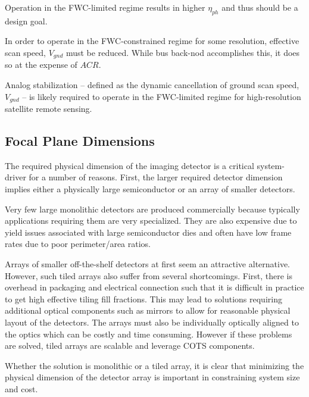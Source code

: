 \documentclass[]{spieman}  %
\begin{document}
\begin{observation}
Operation in the FWC-limited regime results in higher $\eta_{ph}$ and thus should be a design goal.
\end{observation}

In order to operate in the FWC-constrained regime for some resolution, effective scan speed, $V_{gnd}$ must be reduced.  While bus back-nod accomplishes this, it does so at the expense of $ACR$.

\begin{observation}
Analog stabilization -- defined as the dynamic cancellation of ground scan speed, $V_{gnd}$ -- is likely required to operate in the FWC-limited regime for high-resolution satellite remote sensing.
\end{observation}

\subsection{Focal Plane Dimensions}
\label{sec:fp_dimensions}
The required physical dimension of the imaging detector is a critical system-driver for a number of reasons.  First, the larger required detector dimension implies either a physically large semiconductor or an array of smaller detectors.  

Very few large monolithic detectors are produced commercially because typically applications requiring them are very specialized.  They are also expensive due to yield issues associated with large semiconductor dies and often have low frame rates due to poor perimeter/area ratios.

Arrays of smaller off-the-shelf detectors at first seem an attractive alternative.  However, such tiled arrays also suffer from several shortcomings.  First, there is overhead in packaging and electrical connection such that it is difficult in practice to get high effective tiling fill fractions.  This may lead to solutions requiring additional optical components such as mirrors to allow for reasonable physical layout of the detectors.  The arrays must also be individually optically aligned to the optics which can be costly and time consuming. However if these problems are solved, tiled arrays are scalable and leverage COTS components.

Whether the solution is monolithic or a tiled array, it is clear that minimizing the physical dimension of the detector array is important in constraining system size and cost.
\end{document}
